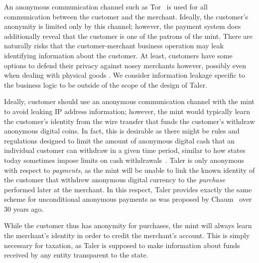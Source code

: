 \documentclass{llncs}
\begin{document}
An anonymous communication channel such as Tor~\cite{tor-design} is
used for all communication between the customer and the merchant.
Ideally, the customer's anonymity is limited only by this channel;
however, the payment system does additionally reveal that the customer
is one of the patrons of the mint.
There are naturally risks that the customer-merchant business operation 
may leak identifying information about the customer.   At least, customers
have some options to defend their privacy against nosey merchants however,
possibly even when dealing with physical goods \cite{apod}.
We consider information leakage specific to the business logic to be
outside of the scope of the design of Taler.

Ideally, customer should use an anonymous communication channel with 
the mint to avoid leaking IP address information; however, the mint 
would typically learn the customer's identity from the wire transfer
that funds the customer's withdraw anonymous digital coins.  
In fact, this is desirable as there might be rules and regulations
designed to limit the amount of anonymous digital cash that an
individual customer can withdraw in a given time period, similar to
how states today sometimes impose limits on cash
withdrawals~\cite{france2015cash,greece2015cash}.  
Taler is only anonymous with respect to {\em payments}, as the mint
will be unable to link the known identity of the customer that withdrew
anonymous digital currency to the {\em purchase} performed later at the
merchant.  In this respect, Taler provides exactly the same scheme for
unconditional anonymous payments as was proposed by
Chaum~\cite{chaum1983blind,chaum1990untraceable} over 30 years ago.

While the customer thus has anonymity for purchases, the mint will
always learn the merchant's identity in order to credit the merchant's
account.  This is simply necessary for taxation, as Taler is supposed
to make information about funds received by any entity transparent
to the state.

\end{document}
